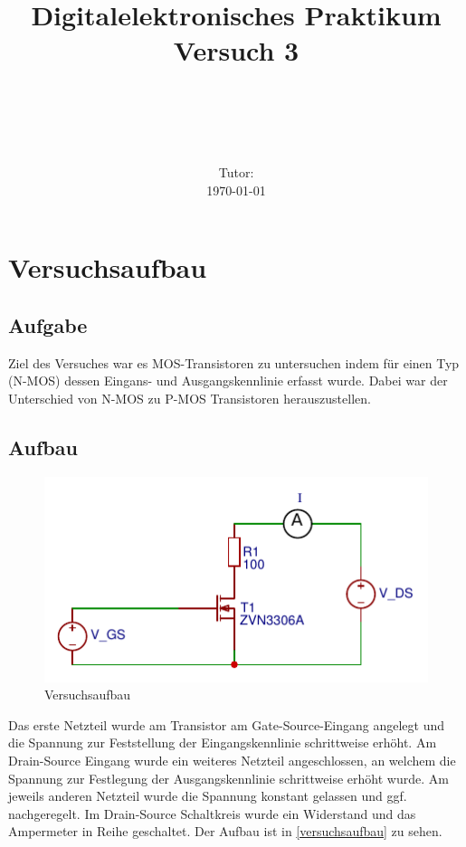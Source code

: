 \documentclass[11pt, a4paper]{article}
\title{\textbf{Digitalelektronisches Praktikum\\ Versuch 3}}
\author{\ATutantName \\ \emph{\ATutantEmail} \and \BTutantName\\ \emph{\BTutantEmail}}
\date{\Gruppennummer \\[3ex] Tutor: \Tutorname \\[3ex] \today}
\begin{document}
\clearpage
\maketitle
\thispagestyle{empty}
\newpage


\section*{Versuchsaufbau}
\subsection*{Aufgabe}
Ziel des Versuches war es MOS-Transistoren zu untersuchen indem für einen Typ (N-MOS) dessen Eingans- und Ausgangskennlinie erfasst wurde. Dabei war der Unterschied von N-MOS zu P-MOS Transistoren herauszustellen. 
\subsection*{Aufbau}
\begin{figure}
    \centering
    \includegraphics[width=\linewidth]{aufbau.pdf}
    \caption{Versuchsaufbau}
    \label{versuchsaufbau}
\end{figure}
Das erste Netzteil wurde am Transistor am Gate-Source-Eingang angelegt und die Spannung zur Feststellung der Eingangskennlinie schrittweise erhöht. Am Drain-Source Eingang wurde ein weiteres Netzteil angeschlossen, an welchem die Spannung zur Festlegung der Ausgangskennlinie schrittweise erhöht wurde. Am jeweils anderen Netzteil wurde die Spannung konstant gelassen und ggf. nachgeregelt. Im Drain-Source Schaltkreis wurde ein Widerstand und das Ampermeter in Reihe geschaltet. Der Aufbau ist in \autoref{versuchsaufbau} zu sehen.
\end{document}
